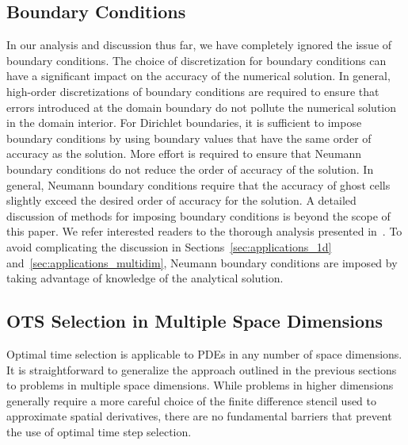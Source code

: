 \documentclass[oneeqnum,onefignum,onetabnum,onethmnum]{siamltex}
\begin{document}
\subsection{Boundary Conditions}
In our analysis and discussion thus far, we have completely ignored the issue 
of boundary conditions.  The choice of discretization for boundary conditions
can have a significant impact on the accuracy of the numerical solution.  In 
general, high-order discretizations of boundary conditions are required to 
ensure that errors introduced at the domain boundary do not pollute the 
numerical solution in the domain interior.  For Dirichlet boundaries, it
is sufficient to impose boundary conditions by using boundary values that have 
the same order of accuracy as the solution.  More effort is required to ensure 
that Neumann boundary conditions do not reduce the order of accuracy of the 
solution.  In general, Neumann boundary conditions require that the accuracy 
of ghost cells slightly exceed the desired order of accuracy for the 
solution.  A detailed discussion of methods for imposing boundary conditions 
is beyond the scope of this paper.  We refer interested readers to the 
thorough analysis presented in~\cite{gko_book}.  To avoid complicating the 
discussion in Sections~\ref{sec:applications_1d} 
and~\ref{sec:applications_multidim}, Neumann boundary conditions are imposed 
by taking advantage of knowledge of the analytical solution.


\subsection{\label{sec:ots_higher_spatial_dims}
            OTS Selection in Multiple Space Dimensions}
Optimal time selection is applicable to PDEs in any number of space
dimensions.  It is straightforward to generalize the approach outlined in 
the previous sections to problems in multiple space dimensions.  While 
problems in higher dimensions generally require a more careful choice of 
the finite difference stencil used to approximate spatial derivatives,
there are no fundamental barriers that prevent the use of optimal time step 
selection.
\end{document}
